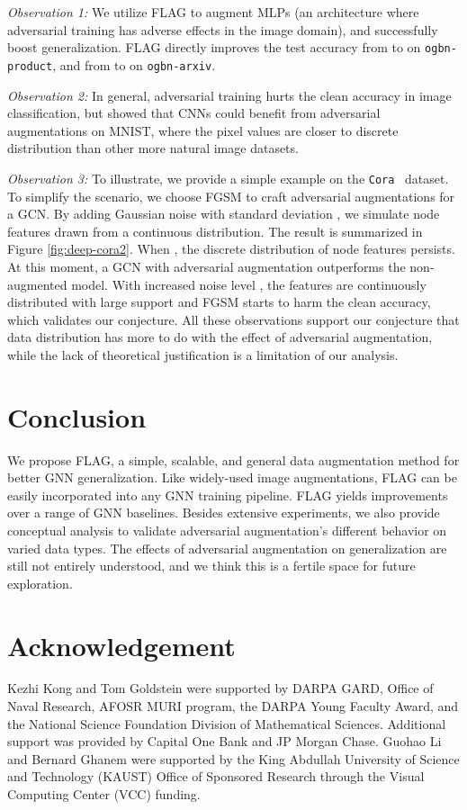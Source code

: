 \documentclass[11pt]{article}
\begin{document}
\textit{Observation 1:} We utilize FLAG to augment MLPs (an architecture where adversarial training has adverse effects in the image domain), and successfully boost generalization. FLAG directly improves the test accuracy from  to  on \texttt{ogbn-product}, and from  to  on \texttt{ogbn-arxiv}. 

\textit{Observation 2:} In general, adversarial training hurts the clean accuracy in image classification, but \citet{tsipras2018robustness} showed that CNNs could benefit from adversarial augmentations on MNIST, where the pixel values are closer to discrete distribution than other more natural image datasets. 

\textit{Observation 3:} To illustrate, we provide a simple example on the \texttt{Cora}~\citep{getoor2005link} dataset. To simplify the scenario, we choose FGSM to craft adversarial augmentations for a GCN. By adding Gaussian noise with standard deviation , we simulate node features drawn from a continuous distribution. The result is summarized in Figure \ref{fig:deep-cora2}. When , the discrete distribution of node features persists. At this moment, a GCN with adversarial augmentation outperforms the non-augmented model. With increased noise level , the features are continuously distributed with large support and FGSM starts to harm the clean accuracy, which validates our conjecture. All these observations support our conjecture that data distribution has more to do with the effect of adversarial augmentation, while the lack of theoretical justification is a limitation of our analysis.

  
   \section{Conclusion}

We propose FLAG, a simple,  scalable, and general data augmentation method for better GNN generalization.  Like widely-used image augmentations, FLAG can be easily incorporated into any GNN training pipeline. FLAG yields improvements over a range of GNN baselines. Besides extensive experiments, we also provide conceptual analysis to validate adversarial augmentation's different behavior on varied data types. The effects of adversarial augmentation on generalization are still not entirely understood, and we think this is a fertile space for future exploration. 
\section{Acknowledgement}
Kezhi Kong and Tom Goldstein were supported by DARPA GARD, Office of Naval Research, AFOSR MURI program, the DARPA Young Faculty Award, and the National Science Foundation Division of Mathematical Sciences. Additional support was provided by Capital One Bank and JP Morgan Chase. Guohao Li and Bernard Ghanem were supported by the King Abdullah University of Science and Technology (KAUST) Office of Sponsored Research through the Visual Computing Center (VCC) funding.
\end{document}
